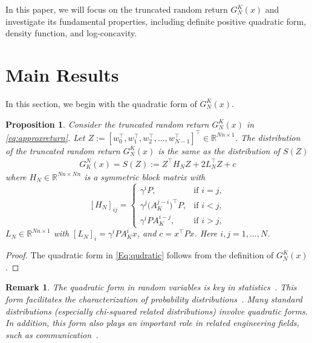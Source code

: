 \documentclass[letterpaper, 10 pt, conference]{ieeeconf}  %
\newtheorem{proposition}{Proposition}[section]
\newtheorem{remark}{Remark}[section]
\begin{document}
 In this paper, we will focus on the truncated random return ${G}_N^{K}(x)$ and investigate its fundamental properties, including definite positive quadratic form, density function, and log-concavity. 

 

\section{Main Results}\label{Sec:mainresults}

In this section, we begin with the quadratic form of $G^K_N(x)$. 
\begin{proposition}\label{Prop:quadratic}
 Consider the truncated random return $G^K_N(x)$ in \eqref{eq:approxreturn}. Let $Z:=\left[w_0^\top,w_1^\top,w_2^\top,...,w_{N-1}^\top\right]^\top\in \mathbb{R}^{N n\times 1}$.  The  distribution of the truncated random return $G_N^K(x)$ is the same as the distribution of $ S(Z)$
        \begin{equation}\label{Eq:qudratic}
    \begin{aligned}
        G^N_K(x)=S(Z):= Z^\top H_NZ+ 2L_N^\top Z+ c
    \end{aligned}
\end{equation}
where $H_N\in \mathbb{R}^{Nn\times Nn}$ is a symmetric block  matrix with 
\begin{equation}\label{Eq:Hmatrix}
[H_N]_{ij} =
\begin{cases}
\gamma^i P, & \text{if } i = j,\\[6pt]
\gamma^j \bigl(A_K^{j-i}\bigr)^\top P, & \text{if } i < j,\\[6pt]
\gamma^iPA_K^{i-j}, & \text{if } i > j,
\end{cases}
\end{equation}
$L_N \in \mathbb{R}^{Nn\times 1}$ with $[L_N]_i=\gamma^{i}PA_K^{i}x$,  and $c=x^\top P x$. Here $i,j=1,\dots,N$. 
\end{proposition}
\begin{proof}
The quadratic form in \eqref{Eq:qudratic} follows from the definition of $G^K_N(x)$. 
\end{proof}

\begin{remark}
   The quadratic form in random variables is key in statistics~\cite{Mathai1992, varberg1966convergence}. This form facilitates the characterization of probability distributions~\cite{baldessari1967distribution,zhang2025probability}. Many standard distributions (especially chi-squared related distributions) involve quadratic forms.  In addition, this form also plays an important role in related engineering fields, such as communication~\cite{al2009distribution}.  
\end{remark}
\end{document}
